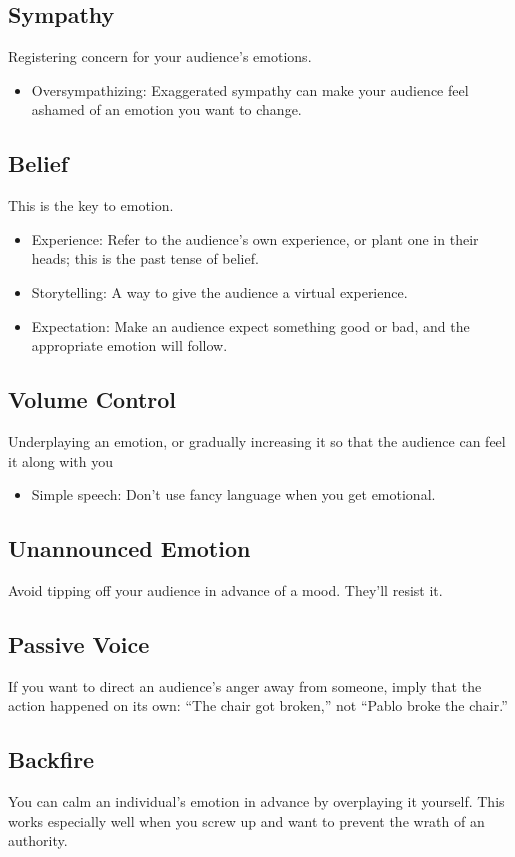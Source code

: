 \subsection{Sympathy}
Registering concern for your audience's emotions.
\begin{itemize}
	\item Oversympathizing: Exaggerated sympathy can make your audience feel ashamed of an emotion you want to change.
\end{itemize}

\subsection{Belief}
This is the key to emotion.
\begin{itemize}
	\item Experience: Refer to the audience's own experience, or plant one in their heads; this is the past tense of belief.
	\item Storytelling: A way to give the audience a virtual experience.
	\item Expectation: Make an audience expect something good or bad, and the appropriate emotion will follow.
\end{itemize}

\subsection{Volume Control}
Underplaying an emotion, or gradually increasing it so that the audience can feel it along with you
\begin{itemize}
	\item Simple speech: Don't use fancy language when you get emotional.
\end{itemize}

\subsection{Unannounced Emotion}
Avoid tipping off your audience in advance of a mood. They'll resist it.

\subsection{Passive Voice}
If you want to direct an audience's anger away from someone, imply that the action happened on its own: ``The chair got broken,'' not ``Pablo broke the chair.''

\subsection{Backfire}
You can calm an individual's emotion in advance by overplaying it yourself. This works especially well when you screw up and want to prevent the wrath of an authority.

